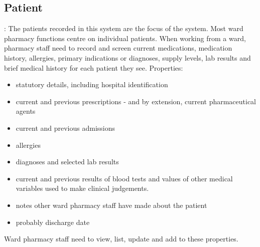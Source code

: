 \documentclass[letterpaper]{amsart}
\begin{document}
\subsection{Patient}: The patients recorded in this system are the focus of the system.  Most ward pharmacy functions centre on individual patients.  When working from a ward, pharmacy staff need to record and screen current medications, medication history, allergies, primary indications or diagnoses, supply levels, lab results and brief medical history for each patient they see.
Properties:
\begin{itemize}
    \item statutory details, including hospital identification
    \item current and previous prescriptions - and by extension, current pharmaceutical agents
    \item current and previous admissions
    \item allergies
    \item diagnoses and selected lab results 
    \item current and previous results of blood tests and values of other medical variables used to make clinical judgements. 
    \item notes other ward pharmacy staff have made about the patient 
    \item probably discharge date
\end{itemize}
Ward pharmacy staff need to view, list, update and add to these properties.
\end{document}
